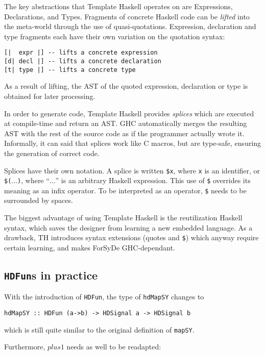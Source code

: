 The key abstractions that Template Haskell operates on are
Expressions, Declarations, and Types. Fragments of concrete Haskell
code can be \textit{lifted} into the meta-world through the use of
quasi-quotations. Expression, declaration and type fragments each have
their own variation on the quotation syntax:

\begin{lstlisting}
[|  expr |] -- lifts a concrete expression 
[d| decl |] -- lifts a concrete declaration 
[t| type |] -- lifts a concrete type 
\end{lstlisting}

As a result of lifting, the AST of the quoted expression, declaration
or type is obtained for later processing.

In order to generate code, Template Haskell provides \textit{splices}
which are executed at compile-time and return an AST. GHC
automatically merges the resulting AST with the rest of the source
code as if the programmer actually wrote it. Informally, it can  said
that splices work like C macros, but are type-safe, ensuring the
generation of correct code.

Splices have their own notation. A splice is written \texttt{\$x},
where \texttt{x} is an identifier, or \texttt{\$($\dots$)}, where
``$\dots$'' is an arbitrary Haskell expression. This use of
\texttt{\$} overrides its meaning as an infix operator. To be
interpreted as an operator, \texttt{\$} needs to be surrounded by spaces.

The biggest advantage of using Template Haskell is the reutilization
Haskell syntax, which saves the designer from learning a new embedded
language. As a drawback, TH introduces syntax extensions (quotes and
\texttt{\$}) which anyway require certain learning, and makes ForSyDe
GHC-dependant.

\subsection{\texttt{HDFun}s in practice}

With the introduction of \texttt{HDFun}, the type of \texttt{hdMapSY}
changes to
\begin{lstlisting}
hdMapSY :: HDFun (a->b) -> HDSignal a -> HDSignal b
\end{lstlisting}
which is still quite similar to the original definition of \texttt{mapSY}.

Furthermore, $\mathit{plus1}$ needs as well to be readapted:

